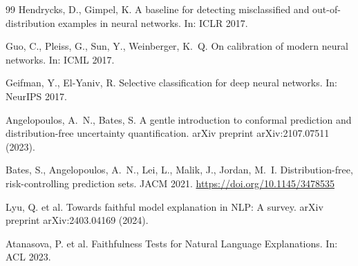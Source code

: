 \documentclass{ceurart}
\begin{document}
\begin{thebibliography}{99}
Hendrycks, D., Gimpel, K. A baseline for detecting misclassified and
out-of-distribution examples in neural networks. In: ICLR 2017.

Guo, C., Pleiss, G., Sun, Y., Weinberger, K.\ Q. On calibration of
modern neural networks. In: ICML 2017.

Geifman, Y., El-Yaniv, R. Selective classification for deep neural
networks. In: NeurIPS 2017.

Angelopoulos, A.\ N., Bates, S. A gentle introduction to conformal
prediction and distribution-free uncertainty quantification. arXiv preprint arXiv:2107.07511 (2023).

Bates, S., Angelopoulos, A.\ N., Lei, L., Malik, J., Jordan, M.\ I.
Distribution-free, risk-controlling prediction sets. JACM 2021.
\url{https://doi.org/10.1145/3478535}

Lyu, Q. et al. Towards faithful model explanation in NLP: A survey.
arXiv preprint arXiv:2403.04169 (2024).

Atanasova, P. et al. Faithfulness Tests for Natural Language
Explanations. In: ACL 2023.

\end{thebibliography}
\end{document}
